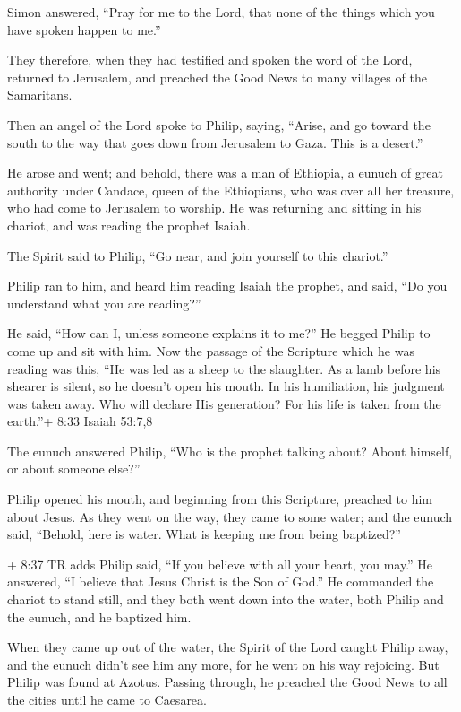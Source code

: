  Simon answered, ``Pray for me to the Lord, that none of
the things which you have spoken happen to me.''

 They therefore, when they had testified and spoken the
word of the Lord, returned to Jerusalem, and preached the Good News to
many villages of the Samaritans.

 Then an angel of the Lord spoke to Philip, saying,
``Arise, and go toward the south to the way that goes down from
Jerusalem to Gaza. This is a desert.''

 He arose and went; and behold, there was a man of
Ethiopia, a eunuch of great authority under Candace, queen of the
Ethiopians, who was over all her treasure, who had come to Jerusalem to
worship.  He was returning and sitting in his chariot, and
was reading the prophet Isaiah.

 The Spirit said to Philip, ``Go near, and join yourself to
this chariot.''

 Philip ran to him, and heard him reading Isaiah the
prophet, and said, ``Do you understand what you are reading?''

 He said, ``How can I, unless someone explains it to me?''
He begged Philip to come up and sit with him.  Now the
passage of the Scripture which he was reading was this, ``He was led as
a sheep to the slaughter. As a lamb before his shearer is silent, so he
doesn't open his mouth.  In his humiliation, his judgment
was taken away. Who will declare His generation? For his life is taken
from the earth.''+ 8:33 Isaiah 53:7,8

 The eunuch answered Philip, ``Who is the prophet talking
about? About himself, or about someone else?''

 Philip opened his mouth, and beginning from this
Scripture, preached to him about Jesus.  As they went on
the way, they came to some water; and the eunuch said, ``Behold, here is
water. What is keeping me from being baptized?''

 + 8:37 TR adds Philip said, ``If you believe with all your
heart, you may.'' He answered, ``I believe that Jesus Christ is the Son
of God.''  He commanded the chariot to stand still, and
they both went down into the water, both Philip and the eunuch, and he
baptized him.

 When they came up out of the water, the Spirit of the Lord
caught Philip away, and the eunuch didn't see him any more, for he went
on his way rejoicing.  But Philip was found at Azotus.
Passing through, he preached the Good News to all the cities until he
came to Caesarea.

